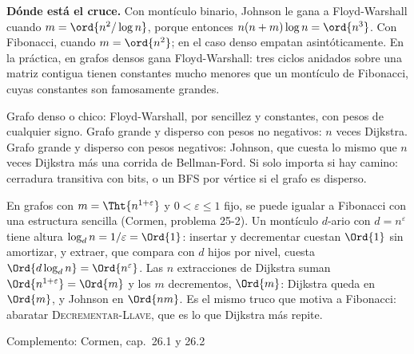 \documentclass[11pt,letterpaper]{article}
\begin{document}
\textbf{Dónde está el cruce.} Con montículo binario, Johnson le gana a
Floyd-Warshall cuando $m = \ord{n^2 / \log n}$, porque entonces
$n(n + m)\log n = \ord{n^3}$. Con Fibonacci, cuando $m = \ord{n^2}$; en el
caso denso empatan asintóticamente. En la práctica, en grafos densos
gana Floyd-Warshall: tres ciclos anidados sobre una matriz contigua
tienen constantes mucho menores que un montículo de Fibonacci, cuyas
constantes son famosamente grandes.

\begin{idea}
  Grafo denso o chico: Floyd-Warshall, por sencillez y constantes, con
  pesos de cualquier signo. Grafo grande y disperso con pesos no
  negativos: $n$ veces Dijkstra. Grafo grande y disperso con pesos
  negativos: Johnson, que cuesta lo mismo que $n$ veces Dijkstra más
  una corrida de Bellman-Ford. Si solo importa si hay camino:
  cerradura transitiva con bits, o un BFS por vértice si el grafo es
  disperso.
\end{idea}

\begin{observacion}
  En grafos con $m = \Tht{n^{1 + \varepsilon}}$ y
  $0 < \varepsilon \le 1$ fijo, se puede igualar a Fibonacci con una
  estructura sencilla (Cormen, problema 25-2). Un montículo $d$-ario
  con $d = n^{\varepsilon}$ tiene altura
  $\log_d n = 1/\varepsilon = \Ord{1}$: insertar y decrementar cuestan
  $\Ord{1}$ sin amortizar, y extraer, que compara con $d$ hijos por
  nivel, cuesta $\Ord{d \log_d n} = \Ord{n^{\varepsilon}}$. Las $n$
  extracciones de Dijkstra suman $\Ord{n^{1 + \varepsilon}} = \Ord{m}$
  y los $m$ decrementos, $\Ord{m}$: Dijkstra queda en $\Ord{m}$, y
  Johnson en $\Ord{nm}$. Es el mismo truco que motiva a Fibonacci:
  abaratar \textsc{Decrementar-Llave}, que es lo que Dijkstra más
  repite.
\end{observacion}

\newpage


  {Complemento: Cormen, cap.\ 26.1 y 26.2}
\label{sec:flujo}
\end{document}
